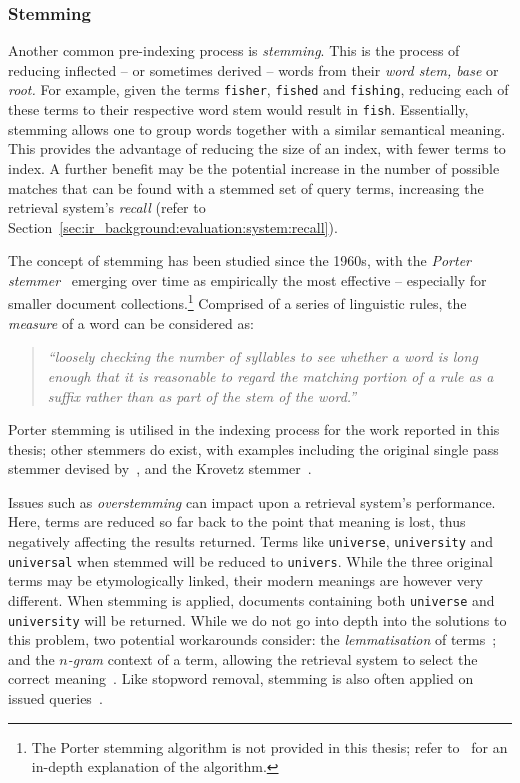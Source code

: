 \subsubsection{Stemming}
Another common pre-indexing process is \emph{stemming}. This is the process of reducing inflected -- or sometimes derived -- words from their \emph{word stem, base} or \emph{root.} For example, given the terms \texttt{fisher}, \texttt{fished} and \texttt{fishing}, reducing each of these terms to their respective word stem would result in \texttt{fish}. Essentially, stemming allows one to group words together with a similar semantical meaning. This provides the advantage of reducing the size of an index, with fewer terms to index. A further benefit may be the potential increase in the number of possible matches that can be found with a stemmed set of query terms, increasing the retrieval system's \emph{recall} (refer to Section~\ref{sec:ir_background:evaluation:system:recall}).

The concept of stemming has been studied since the 1960s, with the \emph{Porter stemmer}~\citep{porter1980algorithm} emerging over time as empirically the most effective -- especially for smaller document collections.\footnote{The Porter stemming algorithm is not provided in this thesis; refer to~\cite{porter1980algorithm} for an in-depth explanation of the algorithm.} Comprised of a series of linguistic rules, the \emph{measure} of a word can be considered as:

\begin{quote}
    \emph{``loosely checking the number of syllables to see whether a word is long enough that it is reasonable to regard the matching portion of a rule as a suffix rather than as part of the stem of the word.''}
\end{quote}

Porter stemming is utilised in the indexing process for the work reported in this thesis; other stemmers do exist, with examples including the original single pass stemmer devised by~\cite{lovins1968development}, and the Krovetz stemmer~\citep{krovetz1993stemming}.

Issues such as \emph{overstemming} can impact upon a retrieval system's performance. Here, terms are reduced so far back to the point that meaning is lost, thus negatively affecting the results returned. Terms like \texttt{universe}, \texttt{university} and \texttt{universal} when stemmed will be reduced to \texttt{univers}. While the three original terms may be etymologically linked, their modern meanings are however very different. When stemming is applied, documents containing both \texttt{universe} and \texttt{university} will be returned. While we do not go into depth into the solutions to this problem, two potential workarounds consider: the \emph{lemmatisation} of terms~\citep{manning2008ir}; and the \emph{$n$-gram} context of a term, allowing the retrieval system to select the correct meaning~\citep{mcnamee2005stemminggrams}. Like stopword removal, stemming is also often applied on issued queries~\citep{croft2009search}.

